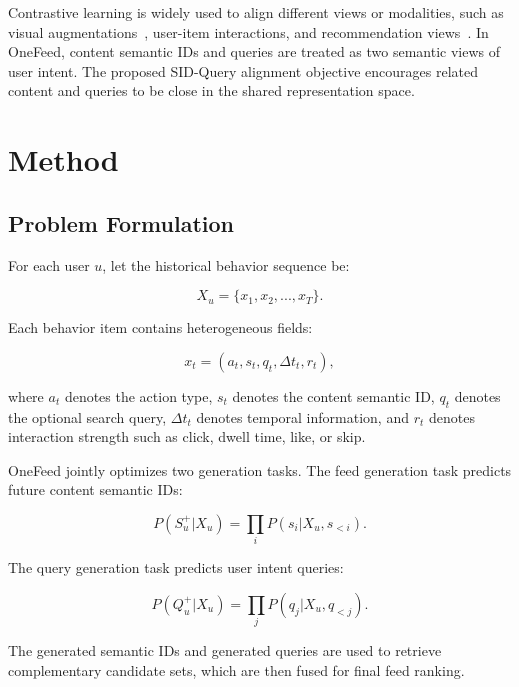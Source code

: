 \documentclass[11pt]{article}
\begin{document}
Contrastive learning is widely used to align different views or modalities, such as visual augmentations~\cite{chen2020simclr,he2020moco}, user-item interactions, and recommendation views~\cite{yao2021selfsupervised}. In OneFeed, content semantic IDs and queries are treated as two semantic views of user intent. The proposed SID-Query alignment objective encourages related content and queries to be close in the shared representation space.

\section{Method}

\subsection{Problem Formulation}

For each user $u$, let the historical behavior sequence be:

\begin{equation}
X_u = \{x_1, x_2, ..., x_T\}.
\end{equation}

Each behavior item contains heterogeneous fields:

\begin{equation}
x_t = (a_t, s_t, q_t, \Delta t_t, r_t),
\end{equation}

where $a_t$ denotes the action type, $s_t$ denotes the content semantic ID, $q_t$ denotes the optional search query, $\Delta t_t$ denotes temporal information, and $r_t$ denotes interaction strength such as click, dwell time, like, or skip.

OneFeed jointly optimizes two generation tasks. The feed generation task predicts future content semantic IDs:

\begin{equation}
P(S_u^+ | X_u) = \prod_i P(s_i | X_u, s_{<i}).
\end{equation}

The query generation task predicts user intent queries:

\begin{equation}
P(Q_u^+ | X_u) = \prod_j P(q_j | X_u, q_{<j}).
\end{equation}

The generated semantic IDs and generated queries are used to retrieve complementary candidate sets, which are then fused for final feed ranking.
\end{document}
